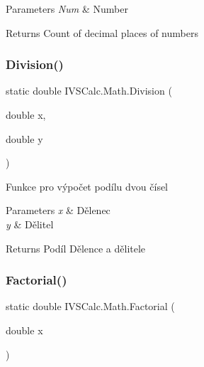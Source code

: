\begin{DoxyParams}{Parameters}
{\em Num} & Number\\
\hline
\end{DoxyParams}
\begin{DoxyReturn}{Returns}
Count of decimal places of numbers
\end{DoxyReturn}
\mbox{\label{class_i_v_s_calc_1_1_math_a2cd5712706a732856fee5014ab95561a}} 
\subsubsection{\texorpdfstring{Division()}{Division()}}
{\footnotesize\ttfamily static double I\+V\+S\+Calc.\+Math.\+Division (\begin{DoxyParamCaption}\item[{double}]{x,  }\item[{double}]{y }\end{DoxyParamCaption})\hspace{0.3cm}{\ttfamily [static]}}



Funkce pro výpočet podílu dvou čísel 


\begin{DoxyParams}{Parameters}
{\em x} & Dělenec\\
\hline
{\em y} & Dělitel\\
\hline
\end{DoxyParams}
\begin{DoxyReturn}{Returns}
Podíl Dělence a dělitele
\end{DoxyReturn}
\mbox{\label{class_i_v_s_calc_1_1_math_a66e3d4331a6998b5cc1e50c292791c0d}} 
\subsubsection{\texorpdfstring{Factorial()}{Factorial()}}
{\footnotesize\ttfamily static double I\+V\+S\+Calc.\+Math.\+Factorial (\begin{DoxyParamCaption}\item[{double}]{x }\end{DoxyParamCaption})\hspace{0.3cm}{\ttfamily [static]}}




